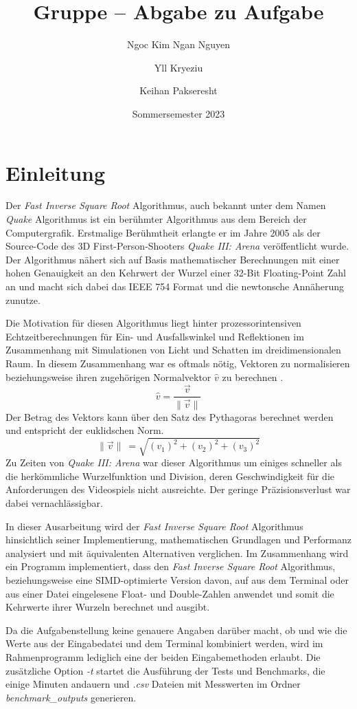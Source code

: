 \documentclass[course=erap]{aspdoc}
\author{Ngoc Kim Ngan Nguyen \and Yll Kryeziu \and Keihan Pakseresht}
\date{Sommersemester 2023} %
\title{Gruppe \theGroup{} -- Abgabe zu Aufgabe \theNumber}
\begin{document}
\maketitle

\section{Einleitung}
Der \emph{Fast Inverse Square Root} Algorithmus, auch bekannt unter dem Namen \emph{Quake} Algorithmus ist ein berühmter Algorithmus aus dem Bereich der Computergrafik. Erstmalige Berühmtheit erlangte er im Jahre 2005 als der Source-Code des 3D First-Person-Shooters \emph{Quake III: Arena} veröffentlicht wurde. Der Algorithmus nähert sich auf Basis mathematischer Berechnungen mit einer hohen Genauigkeit an den Kehrwert der Wurzel einer 32-Bit Floating-Point Zahl an und macht sich dabei das IEEE 754 Format und die newtonsche Annäherung zunutze. \par
Die Motivation für diesen Algorithmus liegt hinter prozessorintensiven Echtzeitberechnungen für Ein- und Ausfallswinkel und Reflektionen im Zusammenhang mit Simulationen von Licht und Schatten im dreidimensionalen Raum. In diesem Zusammenhang war es oftmals nötig, Vektoren zu normalisieren beziehungsweise ihren zugehörigen Normalvektor \(\hat{v}\) zu berechnen \cite{Robertson}.
\[\hat{v} = \frac{\vec v}{\lVert \vec v \rVert}\]
Der Betrag des Vektors kann über den Satz des Pythagoras berechnet werden und entspricht der euklidschen Norm.
\[{\lVert \vec v \rVert}\ = \sqrt{(v_{1})^{2}+(v_{2})^{2}+(v_{3})^{2}}\]
Zu Zeiten von \emph{Quake III: Arena} war dieser Algorithmus um einiges schneller als die herkömmliche Wurzelfunktion und Division, deren Geschwindigkeit für die Anforderungen des Videospiels nicht ausreichte. Der geringe Präzisionsverlust war dabei vernachlässigbar. \par
In dieser Ausarbeitung wird der \emph{Fast Inverse Square Root} Algorithmus hinsichtlich seiner Implementierung, mathematischen Grundlagen und Performanz analysiert und mit äquivalenten Alternativen verglichen. Im Zusammenhang wird ein Programm implementiert, dass den \emph{Fast Inverse Square Root} Algorithmus, beziehungsweise eine SIMD-optimierte Version davon, auf aus dem Terminal oder aus einer Datei eingelesene Float- und Double-Zahlen anwendet und somit die Kehrwerte ihrer Wurzeln berechnet und ausgibt. \par
Da die Aufgabenstellung keine genauere Angaben darüber macht, ob und wie die Werte aus der Eingabedatei und dem Terminal kombiniert werden, wird im Rahmenprogramm lediglich eine der beiden Eingabemethoden erlaubt. Die zusätzliche Option \emph{-t} startet die Ausführung der Tests und Benchmarks, die einige Minuten andauern und \emph{.csv} Dateien mit Messwerten im Ordner \emph{benchmark\_outputs} generieren.
\end{document}
